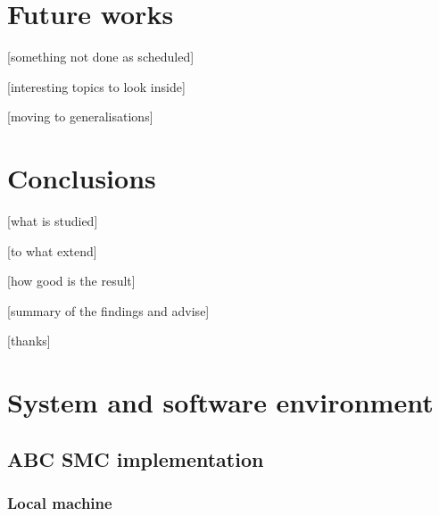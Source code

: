 \documentclass[12pt,a4paper]{report}
\begin{document}













\chapter{Future works}

[something not done as scheduled]

[interesting topics to look inside]

[moving to generalisations]









\chapter{Conclusions}

[what is studied]

[to what extend]

[how good is the result]

[summary of the findings and advise]

[thanks]








\appendix

\chapter{System and software environment}

\section{ABC SMC implementation}

\subsection{Local machine}
\end{document}
